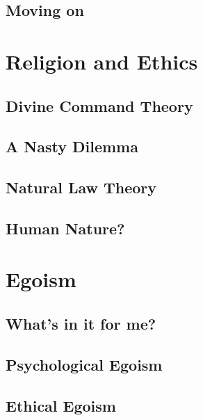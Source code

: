 \documentclass[]{book}
\begin{document}
\hypertarget{moving-on}{%
\section{Moving on}\label{moving-on}}

\hypertarget{religion-and-ethics}{%
\chapter{Religion and Ethics}\label{religion-and-ethics}}

\hypertarget{divine-command-theory}{%
\section{Divine Command Theory}\label{divine-command-theory}}

\hypertarget{a-nasty-dilemma}{%
\section{A Nasty Dilemma}\label{a-nasty-dilemma}}

\hypertarget{natural-law-theory}{%
\section{Natural Law Theory}\label{natural-law-theory}}

\hypertarget{human-nature}{%
\section{Human Nature?}\label{human-nature}}

\hypertarget{egoism}{%
\chapter{Egoism}\label{egoism}}

\hypertarget{whats-in-it-for-me}{%
\section{What's in it for me?}\label{whats-in-it-for-me}}

\hypertarget{psychological-egoism}{%
\section{Psychological Egoism}\label{psychological-egoism}}

\hypertarget{ethical-egoism}{%
\section{Ethical Egoism}\label{ethical-egoism}}
\end{document}
